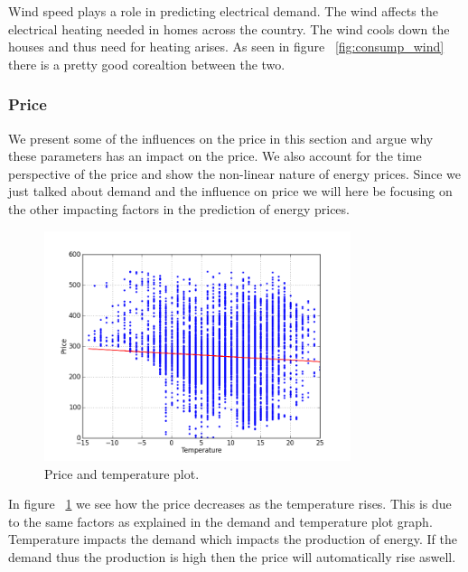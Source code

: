 Wind speed plays a role in predicting electrical demand. The wind affects the electrical heating needed in homes across the country. The wind cools down the houses and thus need for heating arises. As seen in figure ~\ref{fig:consump_wind} there is a pretty good corealtion between the two.

\subsubsection{Price}
We present some of the influences on the price in this section and argue why these parameters has an impact on the price. We also account for the time perspective of the price and show the non-linear nature of energy prices. Since we just talked about demand and the influence on price we will here be focusing on the other impacting factors in the prediction of energy prices.

\begin{figure}[H]
\centering
\includegraphics[width=0.8\textwidth ,natwidth=410,natheight=237]{billeder/energy_price_plots/price_temp.png}
\caption{Price and temperature plot.}
\label{fig:price_temp}
\end{figure}

In figure ~\ref{fig:price_temp} we see how the price decreases as the temperature rises. This is due to the same factors as explained in the demand and temperature plot graph. Temperature impacts the demand which impacts the production of energy. If the demand thus the production is high then the price will automatically rise aswell.

